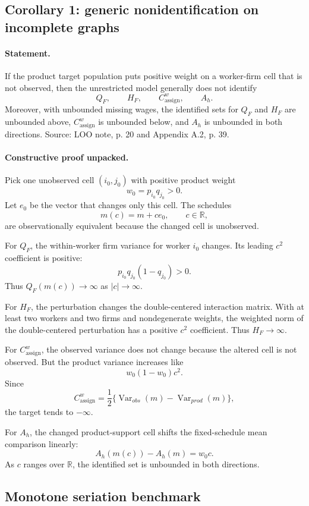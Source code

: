 \documentclass[11pt]{article}
\newcommand{\Var}{\operatorname{Var}}
\newcommand{\R}{\mathbb{R}}
\begin{document}
\subsection{Corollary 1: generic nonidentification on incomplete graphs}

\paragraph{Statement.}
If the product target population puts positive weight on a worker-firm cell that
is not observed, then the unrestricted model generally does not identify
\[
Q_F,\qquad H_F,\qquad C^w_{\mathrm{assign}},\qquad A_h.
\]
Moreover, with unbounded missing wages, the identified sets for \(Q_F\) and
\(H_F\) are unbounded above, \(C^w_{\mathrm{assign}}\) is unbounded below, and
\(A_h\) is unbounded in both directions. Source: LOO note, p. 20 and Appendix
A.2, p. 39.

\paragraph{Constructive proof unpacked.}
Pick one unobserved cell \((i_0,j_0)\) with positive product weight
\[
w_0=p_{i_0}q_{j_0}>0.
\]
Let \(e_0\) be the vector that changes only this cell. The schedules
\[
m(c)=m+c e_0,\qquad c\in\R,
\]
are observationally equivalent because the changed cell is unobserved.

For \(Q_F\), the within-worker firm variance for worker \(i_0\) changes. Its
leading \(c^2\) coefficient is positive:
\[
p_{i_0}q_{j_0}(1-q_{j_0})>0.
\]
Thus \(Q_F(m(c))\to\infty\) as \(|c|\to\infty\).

For \(H_F\), the perturbation changes the double-centered interaction matrix.
With at least two workers and two firms and nondegenerate weights, the weighted
norm of the double-centered perturbation has a positive \(c^2\) coefficient.
Thus \(H_F\to\infty\).

For \(C^w_{\mathrm{assign}}\), the observed variance does not change because
the altered cell is not observed. But the product variance increases like
\[
w_0(1-w_0)c^2.
\]
Since
\[
C^w_{\mathrm{assign}}
=
\frac{1}{2}\{\Var_{obs}(m)-\Var_{prod}(m)\},
\]
the target tends to \(-\infty\).

For \(A_h\), the changed product-support cell shifts the fixed-schedule mean
comparison linearly:
\[
A_h(m(c))-A_h(m)=w_0 c.
\]
As \(c\) ranges over \(\R\), the identified set is unbounded in both directions.

\subsection{Monotone seriation benchmark}
\end{document}
